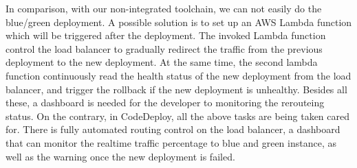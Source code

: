 \par
In comparison, with our non-integrated toolchain, we can not easily do the blue/green deployment. A possible solution is to set up an AWS Lambda function which will be triggered after the deployment. The invoked Lambda function control the load balancer to gradually redirect the traffic from the previous deployment to the new deployment. At the same time, the second lambda function continuously read the health status of the new deployment from the load balancer, and trigger the rollback if the new deployment is unhealthy. 
Besides all these, a dashboard is needed for the developer to monitoring the rerouteing status. On the contrary, in CodeDeploy, all the above tasks are being taken cared for. There is fully automated routing control on the load balancer, a dashboard that can monitor the realtime traffic percentage to blue and green instance, as well as the warning once the new deployment is failed.

